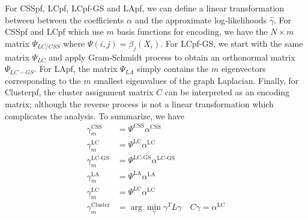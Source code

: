 \documentclass[10pt,letterpaper,final]{article}
\begin{document}
For CSSpf, LCpf, LCpf-GS and LApf, we can define a linear transformation between between the coefficients $\alpha$ and the approximate log-likelihoods $\hat{\gamma}$. For CSSpf and LCpf which use $m$ basis functions for encoding, we have the $N\times m$ matrix $\Psi_{LC/CSS}$ where $\Psi(i,j)=\beta_j(X_i)$. For LCpf-GS, we start with the same matrix $\Psi_{LC}$ and apply Gram-Schmidt process to obtain an orthonormal matrix $\Psi_{LC-GS}$. For LApf, the matrix $\Psi_{LA}$ simply contains the $m$ eigenvectors corresponding to the $m$ smallest eigenvalues of the graph Laplacian. Finally, for Clusterpf, the cluster assignment matrix $C$ can be interpreted as an encoding matrix; although the reverse process is not a linear transformation which complicates the analysis. To summarize, we have
\begin{align}
\gamma_m^{\text{CSS}} &= \Psi^{\text{CSS}}\alpha^{\text{CSS}}\\
\gamma_m^{\text{LC}} &= \Psi^{\text{LC}}\alpha^{\text{LC}} \\
\gamma_m^{\text{LC-GS}} &= \Psi^{\text{LC-GS}}\alpha^{\text{LC-GS}} \\
\gamma_m^{\text{LA}} &= \Psi^{\text{LA}}\alpha^{\text{LA}} \\
\gamma_m^{\text{LC}} &= \Psi^{\text{LC}}\alpha^{\text{LC}} \\
\gamma_m^{\text{Cluster}} &= \arg \min_{\gamma} \gamma^T L \gamma \quad C\gamma = \alpha^{\text{LC}} 
\end{align}


\end{document}
